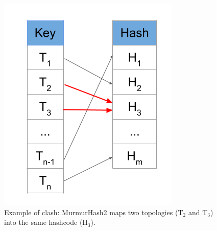\begin{figure}
  \centering
  \includegraphics[scale=0.5]{figures/clash.png}
  \caption{Example of clash: MurmurHash2 maps two topologies (T$_2$ and T$_3$) into the same hashcode (H$_3$).}
  \label{fig:clash}
\end{figure}
%
